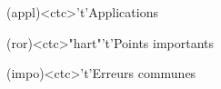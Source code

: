\documentclass[../../main/main.tex]{subfiles}
\begin{document}
\begin{tcn}[%
		sidebyside, fontupper=\small, fontlower=\small
	]
\begin{tcn}[nsp]
	\end{tcn}
	\begin{tcn}[nsp](appl)<ctc>'t'{Applications}
		\vspace{-25pt}
	\end{tcn}
	\begin{tcn}[nsp](ror)<ctc>"hart"'t'{Points importants}
		\vspace{-25pt}
	\end{tcn}
	\begin{tcn}[nsp](impo)<ctc>'t'{Erreurs communes}
		\vspace{-25pt}
	\end{tcn}
\end{tcn}
\end{document}
